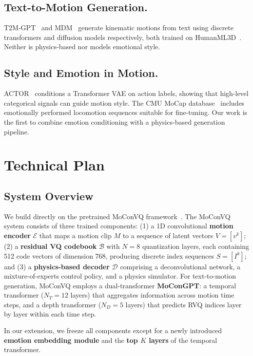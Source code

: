 \documentclass[conference]{IEEEtran}
\begin{document}
\subsection{Text-to-Motion Generation.}
T2M-GPT~\cite{zhang2023t2m} and MDM~\cite{tevet2022human} generate kinematic motions
from text using discrete transformers and diffusion models respectively, both trained
on HumanML3D~\cite{guo2022generating}. Neither is physics-based nor models emotional style.

\subsection{Style and Emotion in Motion.}
ACTOR~\cite{petrovich2021action} conditions a Transformer VAE on action labels, showing
that high-level categorical signals can guide motion style. The CMU MoCap
database~\cite{cmu_mocap} includes emotionally performed locomotion sequences suitable
for fine-tuning. Our work is the first to combine emotion conditioning with a
physics-based generation pipeline.



\section{Technical Plan}

\subsection{System Overview}
 
We build directly on the pretrained MoConVQ framework~\cite{yao2023moconvq}.
The MoConVQ system consists of three trained components: (1) a 1D convolutional
\textbf{motion encoder} $\mathcal{E}$ that maps a motion clip $M$ to a sequence of
latent vectors $V = [v^k]$; (2) a \textbf{residual VQ codebook} $\mathcal{B}$ with
$N=8$ quantization layers, each containing 512 code vectors of dimension 768, producing
discrete index sequences $S = [I^k]$; and (3) a \textbf{physics-based decoder}
$\mathcal{D}$ comprising a deconvolutional network, a mixture-of-experts control policy,
and a physics simulator. For text-to-motion generation, MoConVQ employs a dual-transformer
\textbf{MoConGPT}: a temporal transformer ($N_T = 12$ layers) that aggregates information
across motion time steps, and a depth transformer ($N_D = 5$ layers) that predicts
RVQ indices layer by layer within each time step.
 
In our extension, we freeze all components except for a newly introduced
\textbf{emotion embedding module} and the \textbf{top $K$ layers} of the temporal
transformer.
\end{document}
